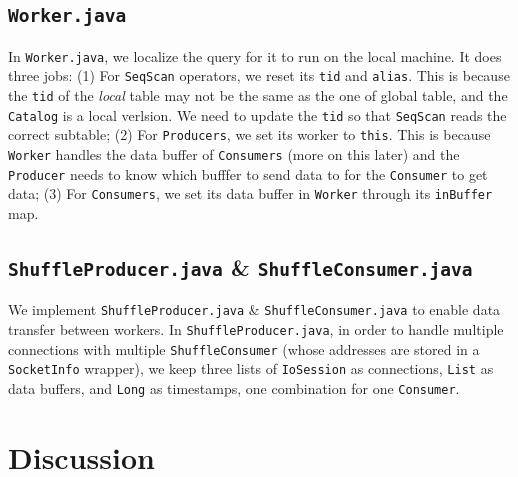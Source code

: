 \documentclass[12pt]{myland}
\def\<#1>{\texttt{#1}}
\begin{document}
    \subsection{\<Worker.java>}
    In \<Worker.java>, we localize the query for it to run on the local machine. It does three jobs: (1) For \<SeqScan>
    operators, we reset its \<tid> and \<alias>. This is because the \<tid> of the \emph{local} table may not be the
    same as the one of global table, and the \<Catalog> is a local verlsion. We need to update the \<tid> so that
    \<SeqScan> reads the correct subtable; (2) For \<Producers>, we set its worker to \<this>. This is because \<Worker>
    handles the data buffer of \<Consumers> (more on this later) and the \<Producer> needs to know which bufffer to send
    data to for the \<Consumer> to get data; (3) For \<Consumers>, we set its data buffer in \<Worker> through its
    \<inBuffer> map.

    \subsection{\<ShuffleProducer.java> \& \<ShuffleConsumer.java>}
    We implement \<ShuffleProducer.java> \& \<ShuffleConsumer.java> to enable data transfer between workers. In
    \<ShuffleProducer.java>, in order to handle multiple connections with multiple \<ShuffleConsumer> (whose addresses
    are stored in a \<SocketInfo> wrapper), we keep three lists of \<IoSession> as connections, \<List> as data buffers,
    and \<Long> as timestamps, one combination for one \<Consumer>.




\section{Discussion}
	\label{discussion}
\end{document}
